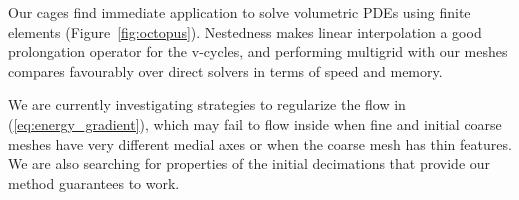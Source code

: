 \documentclass{cgyrf15}
\begin{document}
Our cages find immediate application to solve volumetric PDEs using finite
elements (Figure~\ref{fig:octopus}). Nestedness makes linear interpolation a
good prolongation operator for the v-cycles, and performing multigrid with our
meshes compares favourably over direct solvers in terms of speed and memory.


We are currently investigating strategies to regularize the flow in
(\ref{eq:energy_gradient}), which may fail to flow inside when fine and initial
coarse meshes have very different medial axes or when the coarse mesh has thin
features. We are also searching for properties of the initial decimations that
provide our method guarantees to work. 



 
\end{document}
